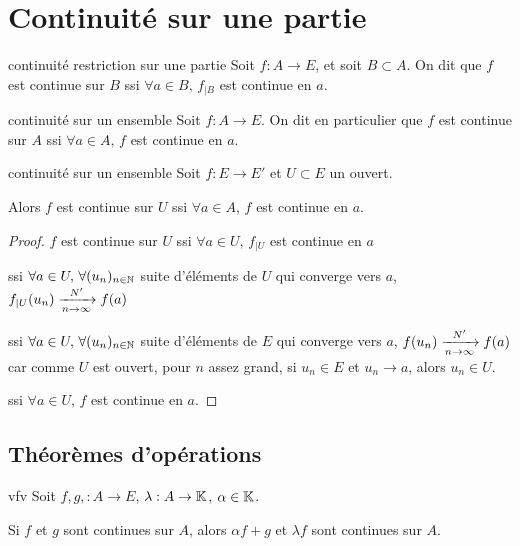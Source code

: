 \section{Continuité sur une partie}

\begin{definition}{continuité restriction sur une partie }{}
    Soit $f: A \to E$, et soit $B \subset A$. On dit que $f$ est continue sur $B$ ssi 
    $\forall a \in B, \, f_{|B}$ est continue en $a$.
\end{definition}


\begin{definition}{continuité sur un ensemble}{}
    Soit $f : A \to E$. On dit en particulier que $f$ est continue sur $A$ ssi
    $\forall a \in A, \, f$ est continue en $a$.
\end{definition}


\begin{proposition}{continuité sur un ensemble}{}
    Soit $f : E \to E'$ et $U \subset E$ un ouvert.

    Alors $f$ est continue sur $U$ ssi $\forall a \in A$, $f$ est continue en $a$. 
\end{proposition}

\begin{proof}
    $f$ est continue sur $U$ ssi $\forall a \in U, \, f_{|U}$ est continue en $a$ 
    
    ssi $\forall a \in U, \, \forall (u_n)_{n \in \N}$ suite d'éléments de $U$ qui converge vers $a$,
    $f_{|U}(u_n) \limitnorme{N'}{n}{\infty} f(a)$

    ssi $\forall a \in U, \, \forall (u_n)_{n \in \N}$ suite d'éléments de $E$ qui converge vers $a$,
    $f(u_n) \limitnorme{N'}{n}{\infty} f(a)$ car comme $U$ est ouvert, pour $n$ assez
    grand, si $u_n \in E$ et $u_n \to a$, alors $u_n \in U$.

    ssi $\forall a \in U, \, f$ est continue en $a$.
\end{proof}

\subsection{Théorèmes d'opérations}

\begin{theorement}{vfv}{}
    Soit $f, g, : A \to E$, $\lambda : A \to \K$, $\alpha \in \K$.

    Si $f$ et $g$ sont continues sur $A$, alors $\alpha f + g$ et $\lambda f$ sont 
    continues sur $A$. 
\end{theorement}


